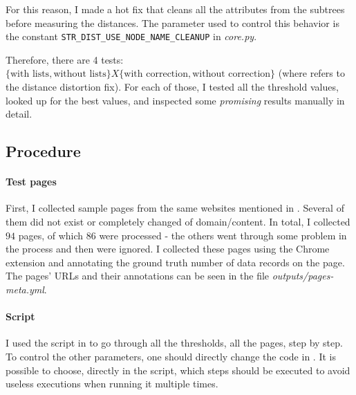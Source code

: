 \documentclass[10pt]{article}
\newcommand{\code}[1]{\colorbox{codegray}{\texttt{#1}}}
\begin{document}
For this reason, I made a hot fix that cleans all the attributes from the subtrees before measuring the distances. The parameter used to control this behavior is the constant \code{STR\_DIST\_USE\_NODE\_NAME\_CLEANUP} in \emph{core.py}.

Therefore, there are 4 tests: $\{\text{with lists}, \text{without lists}\} X \{\text{with correction}, \text{without correction}\}$ (where  refers to the distance distortion fix). For each of those, I tested all the threshold values, looked up for the best values, and inspected some \emph{promising} results manually in detail.



\subsection{Procedure}

\paragraph{Test pages}


First, I collected sample pages from the same websites mentioned in \cite{mdr}\footnotemark. Several of them did not exist or completely changed of domain/content. In total, I collected $94$ pages, of which $86$ were processed - the others went through some problem in the process and then were ignored. I collected these pages using the Chrome extension and annotating the ground truth number of data records on the page. The pages' URLs and their annotations can be seen in the file \emph{outputs/pages-meta.yml}.


\paragraph{Script}

I used the script in  to go through all the thresholds, all the pages, step by step. To control the other parameters, one should directly change the code in . It is possible to choose, directly in the script, which steps should be executed to avoid useless executions when running it multiple times.
\end{document}

